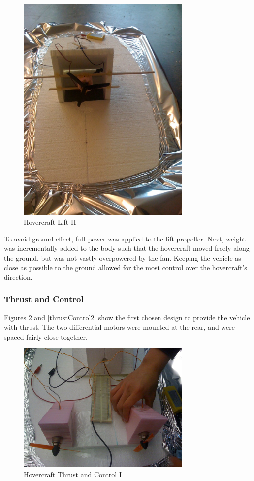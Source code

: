 \begin{figure}[h]
  \begin{center}
    \includegraphics[width=85mm]{imageSources/lift2.png}
  \end{center}
  \caption{Hovercraft Lift II} 
  \label{lift2}
\end{figure}

To avoid ground effect, full power was applied to the lift propeller. Next, weight was incrementally added to the body such that the hovercraft moved freely along the ground, but was not vastly overpowered by the fan. Keeping the vehicle as close as possible to the ground allowed for the most control over the hovercraft's direction.

\subsubsection{Thrust and Control}

Figures \ref{thrustControl1} and \ref{thrustControl2} show the first chosen design to provide the vehicle with thrust. The two differential motors were mounted at the rear, and were spaced fairly close together.

\begin{figure}[h]
  \begin{center}
    \includegraphics[width=85mm]{imageSources/thrustControl1.png}
  \end{center}
  \caption{Hovercraft Thrust and Control I} 
  \label{thrustControl1}
\end{figure}

